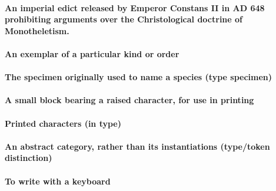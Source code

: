\documentclass[10pt]{article}
\begin{document}
\paragraph{An imperial edict released by Emperor Constans II in AD 648
prohibiting arguments over the Christological doctrine of Monotheletism.}

\paragraph{An exemplar of a particular kind or order}

\paragraph{The specimen originally used to name a species (type specimen)}

\paragraph{A small block bearing a raised character, for use in printing}

\paragraph{Printed characters (in type)}

\paragraph{An abstract category, rather than its instantiations (type/token distinction)}

\paragraph{To write with a keyboard}

{}

\end{document}
